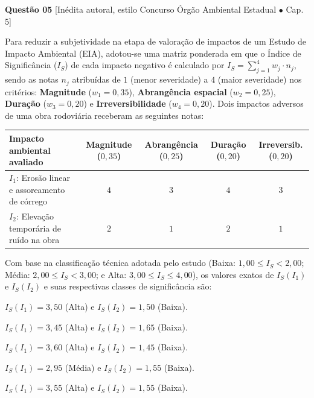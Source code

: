 \vspace{6pt}
\noindent\textbf{Questão 05} {\footnotesize\color{uefsMuted}[Inédita autoral, estilo Concurso Órgão Ambiental Estadual $\bullet$ Cap. 5]}\par
Para reduzir a subjetividade na etapa de valoração de impactos de um Estudo de Impacto Ambiental (EIA), adotou-se uma matriz ponderada em que o Índice de Significância ($I_S$) de cada impacto negativo é calculado por $I_S = \sum_{j=1}^{4} w_j \cdot n_j$, sendo as notas $n_j$ atribuídas de $1$ (menor severidade) a $4$ (maior severidade) nos critérios: \textbf{Magnitude} ($w_1 = 0,35$), \textbf{Abrangência espacial} ($w_2 = 0,25$), \textbf{Duração} ($w_3 = 0,20$) e \textbf{Irreversibilidade} ($w_4 = 0,20$). Dois impactos adversos de uma obra rodoviária receberam as seguintes notas:
\begin{center}
\renewcommand{\arraystretch}{1.15}
\small
\begin{tabularx}{\textwidth}{@{} >{\raggedright\arraybackslash}X cccc @{}}
  \toprule
  \textbf{Impacto ambiental avaliado} & \textbf{Magnitude} ($0,35$) & \textbf{Abrangência} ($0,25$) & \textbf{Duração} ($0,20$) & \textbf{Irreversib.} ($0,20$) \\
  \midrule
  $I_1$: Erosão linear e assoreamento de córrego & $4$ & $3$ & $4$ & $3$ \\
  $I_2$: Elevação temporária de ruído na obra & $2$ & $1$ & $2$ & $1$ \\
  \bottomrule
\end{tabularx}
\end{center}
Com base na classificação técnica adotada pelo estudo (Baixa: $1,00 \le I_S < 2,00$; Média: $2,00 \le I_S < 3,00$; e Alta: $3,00 \le I_S \le 4,00$), os valores exatos de $I_S(I_1)$ e $I_S(I_2)$ e suas respectivas classes de significância são:
\begin{alternativas}
  \item $I_S(I_1) = 3,50$ (Alta) e $I_S(I_2) = 1,50$ (Baixa).
  \item $I_S(I_1) = 3,45$ (Alta) e $I_S(I_2) = 1,65$ (Baixa).
  \item $I_S(I_1) = 3,60$ (Alta) e $I_S(I_2) = 1,45$ (Baixa).
  \item $I_S(I_1) = 2,95$ (Média) e $I_S(I_2) = 1,55$ (Baixa).
  \item $I_S(I_1) = 3,55$ (Alta) e $I_S(I_2) = 1,55$ (Baixa).
\end{alternativas}

